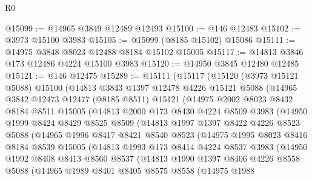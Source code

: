 \begin{lexlean}{R0}
\begin{coremodule}
@15099 := @14965 @3849 @12489 @12493
@15100 := @146 @12483
@15102 := @3973 @15100 @3983
@15105 := @15099 (@8185 @15102) @15086
@15111 := @14975 @3848 @8023 @12488 @8184 @15102 @15005
@15117 := @14813 @3846 @173 @12486 @4224 @15100 @3983
@15120 := @14950 @3845 @12480 @12485
@15121 := @146 @12475
@15289 := @15111
    (@15117
      (@15120
        (@3973 @15121 @5088)
        @15100
        (@14813
          @3843
          @1397
          @12478
          @4226
          @15121
          @5088
          (@14965
            @3842
            @12473
            @12477
            (@8185 @8511)
            @15121
            (@14975
              @2002
              @8023
              @8432
              @8184
              @8511
              @15005
              (@14813
                @2000
                @173
                @8430
                @4224
                @8509
                @3983
                (@14950
                  @1999
                  @8424
                  @8429
                  @8525
                  @8509
                  (@14813
                    @1997
                    @1397
                    @8422
                    @4226
                    @8523
                    @5088
                    (@14965
                      @1996
                      @8417
                      @8421
                      @8540
                      @8523
                      (@14975
                        @1995
                        @8023
                        @8416
                        @8184
                        @8539
                        @15005
                        (@14813
                          @1993
                          @173
                          @8414
                          @4224
                          @8537
                          @3983
                          (@14950
                            @1992
                            @8408
                            @8413
                            @8560
                            @8537
                            (@14813
                              @1990
                              @1397
                              @8406
                              @4226
                              @8558
                              @5088
                              (@14965
                                @1989
                                @8401
                                @8405
                                @8575
                                @8558
                                (@14975
                                  @1988

\end{coremodule}
\end{lexlean}
